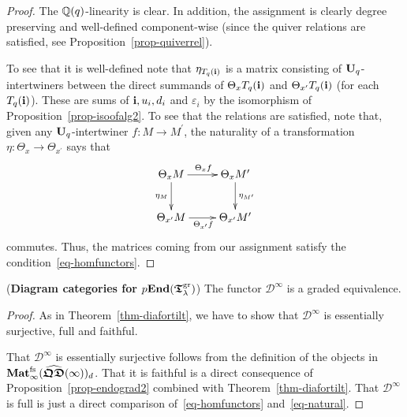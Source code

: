 \begin{proof}
The $\mathbb{Q}(q)$-linearity is clear. 
In addition, the assignment is clearly degree preserving 
and well-defined component-wise (since the quiver relations are satisfied, 
see Proposition~\ref{prop-quiverrel}).




To see that it is well-defined note that 
$\eta_{T_q({\boldsymbol{\mathrm{i}}})}$ is a matrix consisting 
of $\boldsymbol{\mathrm{U}}_q$-intertwiners between the direct 
summands of $\Theta_xT_q({\boldsymbol{\mathrm{i}}})$ and 
$\Theta_{x^{\prime}}T_q({\boldsymbol{\mathrm{i}}})$ (for each $T_q({\boldsymbol{\mathrm{i}}})$). 
These are sums of $\boldsymbol{\mathrm{i}},u_i,d_i$ and $\varepsilon_i$ 
by the isomorphism of Proposition~\ref{prop-isoofalg2}. 
To see that the relations are satisfied, note that, 
given any $\boldsymbol{\mathrm{U}}_q$-intertwiner $f\colon M\to M^{\prime}$, 
the naturality of a transformation $\eta\colon \Theta_x\to \Theta_{x^{\prime}}$ says that
\begin{equation}\label{eq-natural}
\raisebox{0.9cm}{\begin{xy}
  \xymatrix{
      \Theta_x M \ar[r]^{\Theta_x f} \ar[d]_{\eta_M}    &   \Theta_x M^{\prime} \ar[d]^{\eta_{M^{\prime}}}  \\
      \Theta_{x^{\prime}} M \ar[r]_{\Theta_{x^{\prime}} f}             &   \Theta_{x^{\prime}} M^{\prime}  
  }
\end{xy}}
\end{equation}
commutes. Thus, the matrices coming from our assignment 
satisfy the condition~\eqref{eq-homfunctors}.
\end{proof}

\newpage


\begin{thm}(\textbf{Diagram categories for $p\boldsymbol{\mathrm{End}}(\boldsymbol{\mathfrak{T}}_{\lambda}^{\mathrm{gr}})$})\label{thm-diafortilt1}
The functor $\mathcal{D}^{\infty}$ is a graded equivalence.\makeqed
\end{thm}



\begin{proof}
As in Theorem~\ref{thm-diafortilt}, we have to show that $\mathcal{D}^{\infty}$ is 
essentially surjective, full and faithful.



That $\mathcal{D}^{\infty}$ is essentially surjective 
follows from the definition of the objects in 
$\boldsymbol{\mathrm{Mat}}^{\mathrm{fs}}_{\infty}(\widehat{\boldsymbol{\mathfrak{QD}}}(\infty))_d$. That it is faithful is a 
direct consequence of Proposition~\ref{prop-endograd2} 
combined with Theorem~\ref{thm-diafortilt}. 
That $\mathcal{D}^{\infty}$ is full is just a 
direct comparison of~\eqref{eq-homfunctors} and~\eqref{eq-natural}. 
\end{proof}




